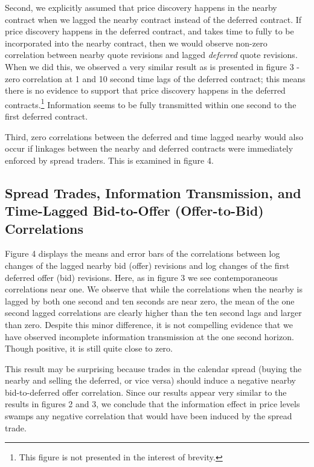 \documentclass[review,12pt]{elsarticle}
\begin{document}
\begin{linenumbers}
Second, we explicitly assumed that price discovery happens in the nearby
contract when we lagged the nearby contract instead of the deferred
contract. If price discovery happens in the deferred contract, and takes
time to fully to be incorporated into the nearby contract, then we would
observe non-zero correlation between nearby quote revisions and lagged
\emph{deferred} quote revisions. When we did this, we observed a very
similar result as is presented in figure 3 - zero correlation at 1 and
10 second time lags of the deferred contract; this means there is no
evidence to support that price discovery happens in the deferred
contracts.\footnote{This figure is not presented in the interest of
  brevity.} Information seems to be fully transmitted within one second
to the first deferred contract.

Third, zero correlations between the deferred and time lagged nearby
would also occur if linkages between the nearby and deferred contracts
were immediately enforced by spread traders. This is examined in figure
4.

\subsection{Spread Trades, Information Transmission, and Time-Lagged
Bid-to-Offer (Offer-to-Bid)
Correlations}\label{spread-trades-information-transmission-and-time-lagged-bid-to-offer-offer-to-bid-correlations-1}

Figure 4 displays the means and error bars of the correlations between
log changes of the lagged nearby bid (offer) revisions and log changes
of the first deferred offer (bid) revisions. Here, as in figure 3 we see
contemporaneous correlations near one. We observe that while the
correlations when the nearby is lagged by both one second and ten
seconds are near zero, the mean of the one second lagged correlations
are clearly higher than the ten second lags and larger than zero.
Despite this minor difference, it is not compelling evidence that we
have observed incomplete information transmission at the one second
horizon. Though positive, it is still quite close to zero.

This result may be surprising because trades in the calendar spread
(buying the nearby and selling the deferred, or vice versa) should
induce a negative nearby bid-to-deferred offer correlation. Since our
results appear very similar to the results in figures 2 and 3, we
conclude that the information effect in price levels swamps any negative
correlation that would have been induced by the spread trade.


\end{linenumbers}
\end{document}
